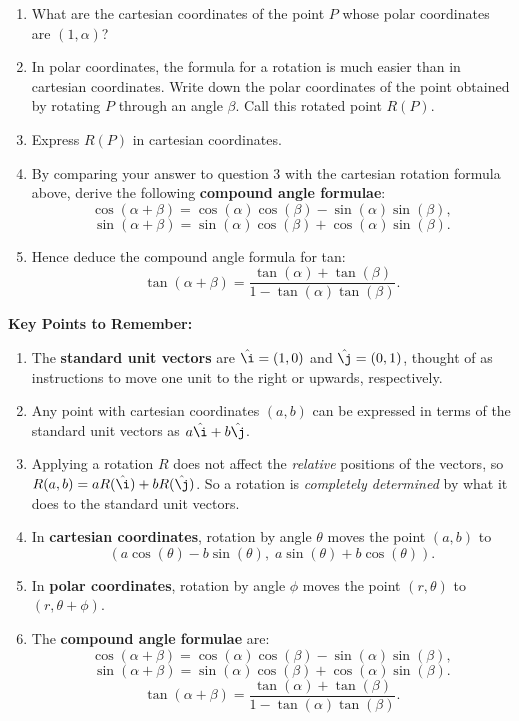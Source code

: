 \documentclass{article}
\def\ihat{\hat{\i}}
\def\jhat{\hat{\j}}
\begin{document}
\begin{enumerate}
\item What are the cartesian coordinates of the point $P$ whose polar coordinates are $(1,\alpha)$?
\item In polar coordinates, the formula for a rotation is much easier than in cartesian coordinates. Write down the polar coordinates of the point obtained by rotating $P$ through an angle $\beta$. Call this rotated point $R(P)$.
\item Express $R(P)$ in cartesian coordinates.
\item By comparing your answer to question 3 with the cartesian rotation formula above, derive the following \textbf{compound angle formulae}:
\[\cos(\alpha+\beta)=\cos(\alpha)\cos(\beta)-\sin(\alpha)\sin(\beta),\]
\[\sin(\alpha+\beta)=\sin(\alpha)\cos(\beta)+\cos(\alpha)\sin(\beta).\]
\item Hence deduce the compound angle formula for tan:
\[\tan(\alpha+\beta) = \frac{\tan(\alpha)+\tan(\beta)}{1-\tan(\alpha)\tan(\beta)}.\]
\end{enumerate}



\clearpage


\textbf{Key Points to Remember:}

\begin{enumerate}
\item The \textbf{standard unit vectors} are $\ihat=(1,0)$ and $\jhat=(0,1)$, thought of as instructions to move one unit to the right or upwards, respectively.
\item Any point with cartesian coordinates $(a,b)$ can be expressed in terms of the standard unit vectors as $a\ihat+b\jhat$.
\item Applying a rotation $R$ does not affect the \textit{relative} positions of the vectors, so $R(a,b)=aR(\ihat)+bR(\jhat)$. So a rotation is \textit{completely determined} by what it does to the standard unit vectors.
\item In \textbf{cartesian coordinates}, rotation by angle $\theta$ moves the point $(a,b)$ to
\[\left(a\cos(\theta)-b\sin(\theta),\; a\sin(\theta)+b\cos(\theta)\right).\]
\item In \textbf{polar coordinates}, rotation by angle $\phi$ moves the point $(r,\theta)$ to $(r,\theta+\phi)$.
\item The \textbf{compound angle formulae} are:
	\[\cos(\alpha+\beta)=\cos(\alpha)\cos(\beta)-\sin(\alpha)\sin(\beta),\]
	\[\sin(\alpha+\beta)=\sin(\alpha)\cos(\beta)+\cos(\alpha)\sin(\beta).\]
	\[\tan(\alpha+\beta) = \frac{\tan(\alpha)+\tan(\beta)}{1-\tan(\alpha)\tan(\beta)}.\]
\end{enumerate}
\end{document}

